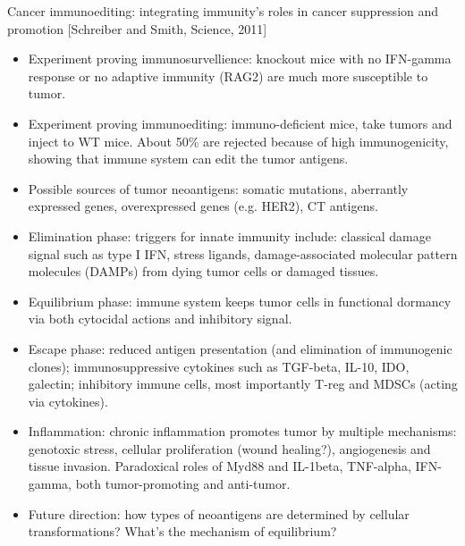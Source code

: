 \documentclass{report}
\begin{document}
Cancer immunoediting: integrating immunity’s roles in cancer suppression and promotion [Schreiber and Smith, Science, 2011]
\begin{itemize}
	\item Experiment proving immunosurvellience: knockout mice with no IFN-gamma response or no adaptive immunity (RAG2) are much more susceptible to tumor. 
	
	\item Experiment proving immunoediting: immuno-deficient mice, take tumors and inject to WT mice. About 50\% are rejected because of high immunogenicity, showing that immune system can edit the tumor antigens. 
	
	\item Possible sources of tumor neoantigens: somatic mutations, aberrantly expressed genes, overexpressed genes (e.g. HER2), CT antigens. 
	
	\item Elimination phase: triggers for innate immunity include: classical damage signal such as type I IFN, stress ligands, damage-associated molecular pattern molecules (DAMPs) from dying tumor cells or damaged tissues. 
	
	\item Equilibrium phase: immune system keeps tumor cells in functional dormancy via both cytocidal actions and inhibitory signal. 
	
	\item Escape phase: reduced antigen presentation (and elimination of immunogenic clones); immunosuppressive cytokines such as TGF-beta, IL-10, IDO, galectin; inhibitory immune cells, most importantly T-reg and MDSCs (acting via cytokines). 
	
	\item Inflammation: chronic inflammation promotes tumor by multiple mechanisms: genotoxic stress, cellular proliferation (wound healing?), angiogenesis and tissue invasion. Paradoxical roles of Myd88 and IL-1beta, TNF-alpha, IFN-gamma, both tumor-promoting and anti-tumor. 
	
	\item Future direction: how types of neoantigens are determined by cellular transformations? What’s the mechanism of equilibrium? 
\end{itemize}
\end{document}
